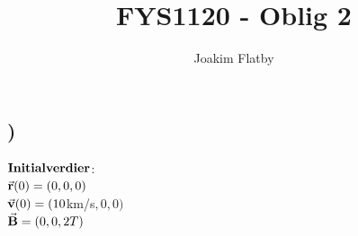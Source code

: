 \documentclass[report,12pt,norsk]{article}
\title{FYS1120 - Oblig 2}
\author{Joakim Flatby}
\begin{document}
\maketitle
\setcounter{section}{1}
\section{}
 
 \subsection{)}
 $\bold{Initialverdier}$:\\
 $\vec{\bold{r}}(0) = (0,0,0)$\\
 $\vec{\bold{v}}(0) = (10$km/s$, 0, 0)$\\
 $\vec{\bold{B}} = (0,0,2T)$
 
\end{document}
